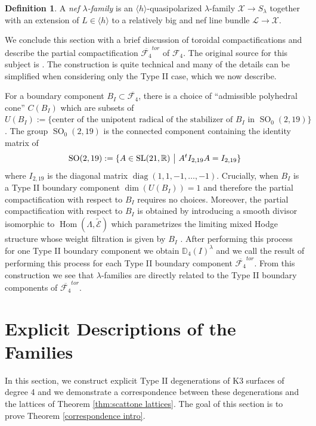 \documentclass[a4paper]{amsart}
\theoremstyle{definition}
\newtheorem{defn}{Definition}[section]
\theoremstyle{plain}
\theoremstyle{remark}
\newcommand{\D}{\mathbb{D}}
\newcommand{\R}{\mathbb{R}}
\begin{document}
\begin{defn}
A \emph{nef $\lambda$-family} is an $\langle h \rangle$-quasipolarized $\lambda$-family
$\mathcal{X}\rightarrow S_\lambda$ together with an extension of $L\in \langle h \rangle$ to a relatively big and nef line bundle $\mathcal{L}\rightarrow \mathcal{X}$.
 \end{defn}

We conclude this section with a brief discussion of toroidal compactifications and describe the partial compactification $\overline{\mathcal{F}_4}^{tor}$ of $\mathcal{F}_4$. The original source for this subject is \cite{AMRT75}. The construction is quite technical and many of the details can be simplified when considering only the Type II case, which we now describe.

For a boundary component $B_I \subset \overline{\mathcal{F}_4}$, there is a choice of ``admissible polyhedral cone'' $C(B_I)$ which are subsets of $U(B_I):=\{\text{center of the unipotent radical of the stabilizer of } B_I \text{ in } \operatorname{SO}_0(2,19)\}$. The group   $\operatorname{SO}_0(2,19)$ is the connected component containing the identity matrix of $$\operatorname{SO}(2,19):=\{A \in \operatorname{SL}(21,\R)\text{ }\big{|}\text{ } A^tI_{2,19}A=I_{2,19}\}$$ where $I_{2,19}$ is the diagonal matrix $\operatorname{diag}(1,1,-1,\dots,-1)$. Crucially, when $B_I$ is a Type II boundary component $\operatorname{dim}(U(B_I))=1$ and therefore the partial compactification with respect to $B_I$ requires no choices. Moreover, the partial compactification with respect to $B_I$ is obtained by introducing a smooth divisor isomorphic to $\operatorname{Hom}(\Lambda,\widetilde{\mathcal{E}})$ which parametrizes the limiting mixed Hodge structure whose weight filtration is given by $B_I$ \cite[Section 4]{Fried84}. After performing this process for one Type II boundary component we obtain $\D_4(I)^\lambda$ and we call the result of performing this process for each Type II boundary component $\overline{\mathcal{F}_4}^{tor}$. From this construction we see that $\lambda$-families are directly related to the Type II boundary components of $\overline{\mathcal{F}_4}^{tor}$.

\section{Explicit Descriptions of the Families}\label{sect:Explicit descriptions of families}

In this section, we construct explicit Type II degenerations of K3 surfaces of degree 4 and we demonstrate a correspondence between these degenerations and the lattices of Theorem \ref{thm:scattone lattices}. The goal of this section is to prove Theorem \ref{correspondence intro}.
\end{document}

